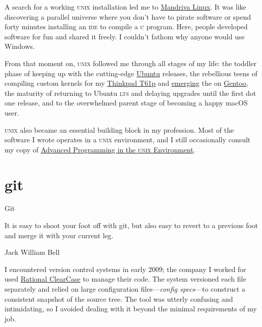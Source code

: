 \documentclass{article}
\begin{document}
A search for a working \textsc{unix} installation led me to \href{https://en.wikipedia.org/wiki/Mandriva_Linux}{Mandriva Linux}.
It was like discovering a parallel universe where you don't have to pirate software or spend forty minutes installing an \textsc{ide} to compile a \textsc{c} program.
Here, people developed software for fun and shared it freely.
I couldn't fathom why anyone would use Windows.

From that moment on, \textsc{unix} followed me through all stages of my life:
the toddler phase of keeping up with the cutting-edge \href{https://ubuntu.com}{Ubuntu} releases,
the rebellious teens of compiling custom kernels for my \href{https://www.thinkwiki.org/wiki/Category:T61p}{Thinkpad T61p} and \href{https://wiki.gentoo.org/wiki/Emerge}{emerging} the \href{https://wiki.gentoo.org/wiki/World_set_(Portage)}{} on \href{https://www.gentoo.org/}{Gentoo},
the maturity of returning to Ubuntu \textsc{lts} and delaying upgrades until the first dot one release,
and to the overwhelmed parent stage of becoming a happy macOS user.

\textsc{unix} also became an essential building block in my profession.
Most of the software I wrote operates in a \textsc{unix} environment, and I still occasionally consult my copy of \href{https://www.goodreads.com/book/show/603263.Advanced_Programming_in_the_UNIX_Environment}{Advanced Programming in the \textsc{unix} Environment}.

\section{git}{Git}

\epigraph{
  It is easy to shoot your foot off with git, but also easy to revert to a previous foot and merge it with your current leg.
}{
  Jack William Bell
}

I encountered version control systems in early 2009; the company I worked for used \href{https://en.wikipedia.org/wiki/IBM_Rational_ClearCase}{Rational ClearCase} to manage their code.
The system versioned each file separately and relied on large configuration files---\emph{config specs}---to construct a consistent snapshot of the source tree.
The tool was utterly confusing and intimidating, so I avoided dealing with it beyond the minimal requirements of my job.
\end{document}
